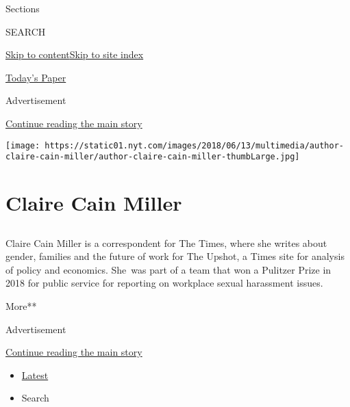 Sections

SEARCH

\protect\hyperlink{site-content}{Skip to
content}\protect\hyperlink{site-index}{Skip to site index}

\href{https://myaccount.nytimes.com/auth/login?response_type=cookie\&client_id=vi}{}

\href{https://www.nytimes.com/section/todayspaper}{Today's Paper}

Advertisement

\protect\hyperlink{after-top}{Continue reading the main story}

\texttt{[image: https://static01.nyt.com/images/2018/06/13/multimedia/author-claire-cain-miller/author-claire-cain-miller-thumbLarge.jpg]}

\hypertarget{claire-cain-miller}{%
\section{Claire Cain Miller}\label{claire-cain-miller}}

\subsection{}

Claire Cain Miller is a correspondent for The Times, where she writes
about gender, families and the future of work for The Upshot, a Times
site for analysis of policy and economics. She~was part of a team that
won a Pulitzer Prize in 2018 for public service for reporting on
workplace sexual harassment issues.

More**

Advertisement

\protect\hyperlink{after-mid1}{Continue reading the main story}

\begin{itemize}
\tightlist
\item
  \protect\hyperlink{stream-panel}{Latest}
\item
  Search
\end{itemize}

